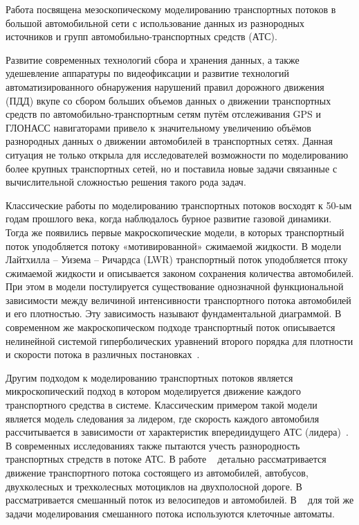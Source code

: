 
Работа посвящена мезоскопическому моделированию транспортных потоков в большой
автомобильной сети с использование данных из разнородных источников и групп
автомобильно-транспортных средств (АТС).

{\actuality} Развитие современных технологий сбора и хранения данных, а также
удешевление аппаратуры по видеофиксации и развитие технологий автоматизированного
обнаружения нарушений правил дорожного движения (ПДД) вкупе со сбором больших объемов
данных о движении транспортных средств по автомобильно-транспортным сетям путём отслеживания
GPS и ГЛОНАСС навигаторами привело к значительному увеличению объёмов разнородных данных о
движении автомобилей в транспортных сетях.
Данная ситуация не только открыла для исследователей возможности по моделированию
более крупных транспортных сетей, но и поставила новые задачи связанные с вычислительной
сложностью решения такого рода задач.

Классические работы по моделированию транспортных потоков восходят к 50-ым годам прошлого века, когда наблюдалось бурное развитие газовой динамики.
Тогда же появились первые макроскопические модели, в которых транспортный поток уподобляется потоку «мотивированной» сжимаемой жидкости.
В модели Лайтхилла – Уизема – Ричардса (LWR)\autocite{LWR/lighthill1955kinematic} транспортный поток уподобляется птоку сжимаемой жидкости и
описывается законом сохранения количества автомобилей.
При этом в модели постулируется существование однозначной функциональной зависимости между величиной интенсивности транспортного потока автомобилей и его плотностью.
Эту зависимость называют фундаментальной диаграммой.
В современном же макроскопическом подходе транспортный поток описывается нелинейной системой гиперболических уравнений второго порядка для плотности и скорости потока в различных постановках~\autocite{siebel2006fundamental, collectiveArticle}.

Другим подходом к моделированию транспортных потоков является микроскопический подход в котором моделируется движение каждого транспортного средства в системе.
Классическим примером такой модели является модель следования за лидером, где скорость каждого автомобиля рассчитывается в зависимости от характеристик впередиидущего АТС (лидера)~\autocite{gasn2017introd}.
В современных исследованиях также пытаются учесть разнородность транспортных стредств в потоке АТС.
В работе ~\autocite{dey2008simulation} детально рассматривается движение транспортного потока состоящего из автомобилей, автобусов, двухколесных и трехколесных мотоциклов на двухполосной дороге.
В ~\autocite{guo2011dynamics} рассматривается смешанный поток из велосипедов и автомобилей.
В ~\autocite{gundaliya2008heterogeneous, lan2005inhomogeneous} для той же задачи моделирования смешанного потока используются клеточные автоматы.

